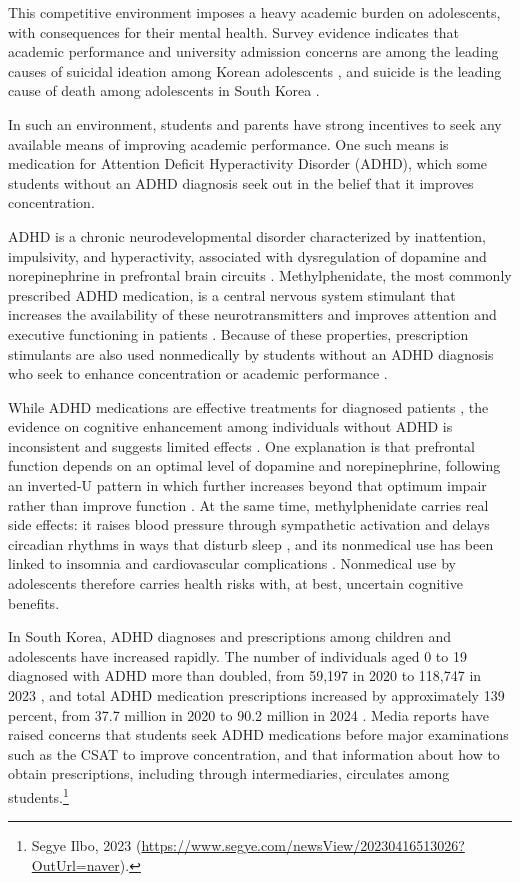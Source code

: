 \documentclass[12pt]{article}
\begin{document}
This competitive environment imposes a heavy academic burden on adolescents, with consequences for their mental health. Survey evidence indicates that academic performance and university admission concerns are among the leading causes of suicidal ideation among Korean adolescents \citep{statkorea2024,nypi2025}, and suicide is the leading cause of death among adolescents in South Korea \citep{statkorea2024}.

In such an environment, students and parents have strong incentives to seek any available means of improving academic performance. One such means is medication for Attention Deficit Hyperactivity Disorder (ADHD), which some students without an ADHD diagnosis seek out in the belief that it improves concentration.

ADHD is a chronic neurodevelopmental disorder characterized by inattention, impulsivity, and hyperactivity, associated with dysregulation of dopamine and norepinephrine in prefrontal brain circuits \citep{arnsten2009,faraone2015}. Methylphenidate, the most commonly prescribed ADHD medication, is a central nervous system stimulant that increases the availability of these neurotransmitters and improves attention and executive functioning in patients \citep{faraone2015}. Because of these properties, prescription stimulants are also used nonmedically by students without an ADHD diagnosis who seek to enhance concentration or academic performance \citep{desantis2008,rabiner2009,smith2011}.

While ADHD medications are effective treatments for diagnosed patients \citep{faraone2015}, the evidence on cognitive enhancement among individuals without ADHD is inconsistent and suggests limited effects \citep{smith2011}. One explanation is that prefrontal function depends on an optimal level of dopamine and norepinephrine, following an inverted-U pattern in which further increases beyond that optimum impair rather than improve function \citep{arnsten2009}. At the same time, methylphenidate carries real side effects: it raises blood pressure through sympathetic activation \citep{volkow2003} and delays circadian rhythms in ways that disturb sleep \citep{antle2012}, and its nonmedical use has been linked to insomnia and cardiovascular complications \citep{lakhan2012,faraone2015}. Nonmedical use by adolescents therefore carries health risks with, at best, uncertain cognitive benefits.

In South Korea, ADHD diagnoses and prescriptions among children and adolescents have increased rapidly. The number of individuals aged 0 to 19 diagnosed with ADHD more than doubled, from 59,197 in 2020 to 118,747 in 2023 \citep{hira2024}, and total ADHD medication prescriptions increased by approximately 139 percent, from 37.7 million in 2020 to 90.2 million in 2024 \citep{mfds2025}. Media reports have raised concerns that students seek ADHD medications before major examinations such as the CSAT to improve concentration, and that information about how to obtain prescriptions, including through intermediaries, circulates among students.\footnote{Segye Ilbo, 2023 (\url{https://www.segye.com/newsView/20230416513026?OutUrl=naver}).}
\end{document}
